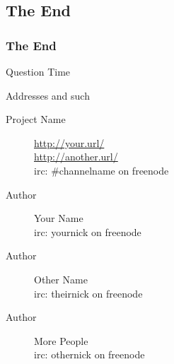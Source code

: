 \documentclass[t,compress,aspectratio=169]{beamer}
\begin{document}
\subsection{The End}
\begin{frame}
    \frametitle{The End}
    \vspace{0.3cm}
    \begin{block}{}
        \centering\begin{Huge}Question Time\end{Huge}
    \end{block}
    \vspace{1.1cm}
    \begin{tiny}
        \begin{block}{Addresses and such}
            \begin{description}
                \item[Project Name] \url{http://your.url/}\\ \url{http://another.url/}\\ irc: \#channelname on freenode
                \item[Author] Your Name\\irc: yournick on freenode
                \item[Author] Other Name\\irc: theirnick on freenode
                \item[Author] More People\\irc: othernick on freenode
            \end{description}
        \end{block}
    \end{tiny}
\end{frame}


% 
% 
\end{document}
